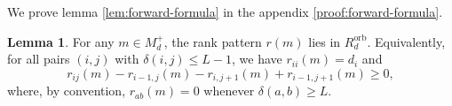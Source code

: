 \documentclass{article}
\theoremstyle{definition}
\newtheorem{lemma}[theorem]{Lemma}
\begin{document}

\noindent
We prove lemma \ref{lem:forward-formula} in the appendix \ref{proof:forward-formula}.
\begin{lemma}\label{lem:orb-ineq}
For any \(m\in M_d^+\), the rank pattern \(r(m)\) lies in \(R_d^{\mathrm{orb}}\).
Equivalently, for all pairs \((i,j)\) with \(\delta(i,j)\le L - 1\), we have $r_{ii}(m)=d_i$ and
\[
r_{ij}(m)-r_{i-1,j}(m)-r_{i,j+1}(m)+r_{i-1,j+1}(m)\ge 0,
\]
where, by convention, \(r_{ab}(m)=0\) whenever \(\delta(a,b)\geq L\).
\end{lemma}
\end{document}
